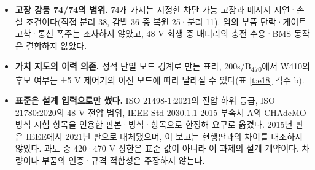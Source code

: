 \begin{itemize}
\item \textbf{고장 강등 74/74의 범위.} 74개 가지는 지정한 차단 가능 고장과 메시지 지연·손실 조건이다(직접 분리 38, 감발 36 중 복원 25·분리 11). 임의 부품 단락·게이트 고착·통신 폭주는 조사하지 않았고, 48 V 회생 중 배터리의 충전 수용·BMS 동작은 결합하지 않았다.
\item \textbf{가치 지도의 이력 의존.} 정적 단일 모드 경계로 만든 표라, 200s/B\textsubscript{470}에서 W410의 후보 여부는 ±5 V 제어기의 이전 모드에 따라 달라질 수 있다(표 \ref{t:e18} 각주 b).
\item \textbf{표준은 설계 입력으로만 썼다.} ISO 21498-1:2021의 전압 하위 등급, ISO 21780:2020의 48 V 전압 범위, IEEE Std 2030.1.1-2015 부속서 A의 CHAdeMO 방식 시험 항목을 인용한 판본·방식·항목으로 한정해 요구로 옮겼다. 2015년 판은 IEEE에서 2021년 판으로 대체됐으며, 이 보고는 현행판과의 차이를 대조하지 않았다. 과도 중 420·470 V 상한은 표준 값이 아니라 이 과제의 설계 계약이다. 차량이나 부품의 인증·규격 적합성은 주장하지 않는다.
\end{itemize}
